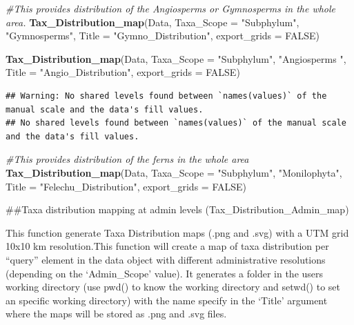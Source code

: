\documentclass[
]{article}
\newenvironment{Shaded}{\begin{snugshade}}{\end{snugshade}}
\newcommand{\AttributeTok}[1]{\textcolor[rgb]{0.13,0.29,0.53}{#1}}
\newcommand{\CommentTok}[1]{\textcolor[rgb]{0.56,0.35,0.01}{\textit{#1}}}
\newcommand{\ConstantTok}[1]{\textcolor[rgb]{0.56,0.35,0.01}{#1}}
\newcommand{\FunctionTok}[1]{\textcolor[rgb]{0.13,0.29,0.53}{\textbf{#1}}}
\newcommand{\NormalTok}[1]{#1}
\newcommand{\StringTok}[1]{\textcolor[rgb]{0.31,0.60,0.02}{#1}}
\begin{document}
\begin{Shaded}
\begin{Highlighting}[]
\CommentTok{\#This provides distribution of the Angiosperms or Gymnosperms in the whole area.}
\FunctionTok{Tax\_Distribution\_map}\NormalTok{(Data, }\AttributeTok{Taxa\_Scope =} \StringTok{"Subphylum"}\NormalTok{, }\StringTok{"Gymnosperms"}\NormalTok{, }\AttributeTok{Title =} \StringTok{"Gymno\_Distribution"}\NormalTok{, }\AttributeTok{export\_grids =} \ConstantTok{FALSE}\NormalTok{)}

\FunctionTok{Tax\_Distribution\_map}\NormalTok{(Data, }\AttributeTok{Taxa\_Scope =} \StringTok{"Subphylum"}\NormalTok{, }\StringTok{"Angiosperms "}\NormalTok{, }\AttributeTok{Title =} \StringTok{"Angio\_Distribution"}\NormalTok{, }\AttributeTok{export\_grids =} \ConstantTok{FALSE}\NormalTok{)}
\end{Highlighting}
\end{Shaded}

\begin{verbatim}
## Warning: No shared levels found between `names(values)` of the manual scale and the data's fill values.
## No shared levels found between `names(values)` of the manual scale and the data's fill values.
\end{verbatim}

\begin{Shaded}
\begin{Highlighting}[]
\CommentTok{\#This provides distribution of the ferns in the whole area}
\FunctionTok{Tax\_Distribution\_map}\NormalTok{(Data, }\AttributeTok{Taxa\_Scope =} \StringTok{"Subphylum"}\NormalTok{, }\StringTok{"Monilophyta"}\NormalTok{, }\AttributeTok{Title =} \StringTok{"Felechu\_Distribution"}\NormalTok{, }\AttributeTok{export\_grids =} \ConstantTok{FALSE}\NormalTok{)}
\end{Highlighting}
\end{Shaded}

\#\#Taxa distribution mapping at admin levels
(Tax\_Distribution\_Admin\_map)

This function generate Taxa Distribution maps (.png and .svg) with a UTM
grid 10x10 km resolution.This function will create a map of taxa
distribution per ``query'' element in the data object with different
administrative resolutions (depending on the `Admin\_Scope' value). It
generates a folder in the users working directory (use pwd() to know the
working directory and setwd() to set an specific working directory) with
the name specify in the `Title' argument where the maps will be stored
as .png and .svg files.
\end{document}
